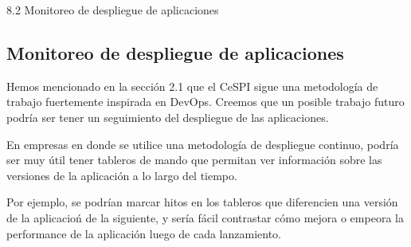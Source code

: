 8.2 Monitoreo de despliegue de aplicaciones
\subsection{Monitoreo de despliegue de aplicaciones}
\label{del-despliegue-de-aplicaciones}

Hemos mencionado en la sección 2.1 que el CeSPI sigue una metodología de trabajo fuertemente inspirada en DevOps. Creemos que un posible trabajo futuro podría ser tener un seguimiento del despliegue de las aplicaciones.

En empresas en donde se utilice una metodología de despliegue continuo, podría ser muy útil tener tableros de mando que permitan ver información sobre las versiones de la aplicación a lo largo del tiempo.

Por ejemplo, se podrían marcar hitos en los tableros que diferencien una versión de la aplicacioń de la siguiente, y sería fácil contrastar cómo mejora o empeora la performance de la aplicación luego de cada lanzamiento.
